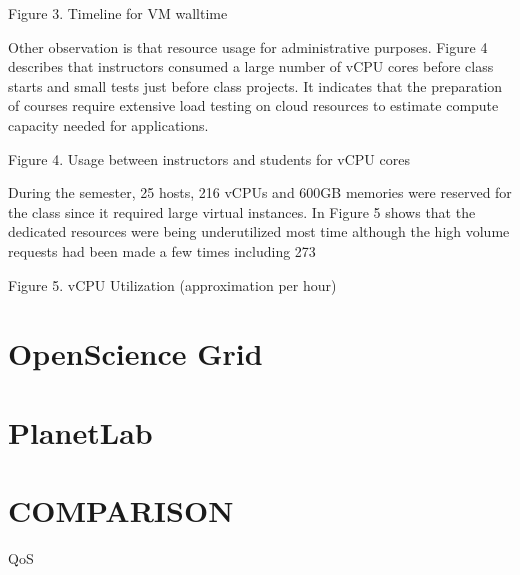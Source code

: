 \documentclass{sig-alternate}
\begin{document}
 
Figure 3. Timeline for VM walltime

Other observation is that resource usage for administrative purposes. Figure 4 describes that instructors consumed a large number of vCPU cores before class starts and small tests just before class projects. It indicates that the preparation of courses require extensive load testing on cloud resources to estimate compute capacity needed for applications.

 
Figure 4. Usage between instructors and students for vCPU cores

During the semester, 25 hosts, 216 vCPUs and 600GB memories were reserved for the class since it required large virtual instances. In Figure 5 shows that the dedicated resources were being underutilized most time although the high volume requests had been made a few times including 273%
 
Figure 5. vCPU Utilization (approximation per hour)

\section{OpenScience Grid}

\section{PlanetLab}

\section{COMPARISON}

QoS
\end{document}
